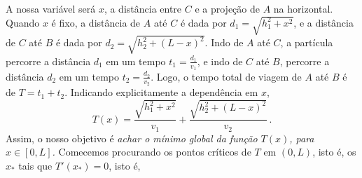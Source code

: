 \begin{center}
\begin{bmlimage}\end{bmlimage}
\end{center}
A nossa variável será $x$, a distância entre $C$ e a projeção de $A$ na
horizontal.
Quando $x$ é fixo, a distância de $A$ até $C$ é dada por
$d_1=\sqrt{h_1^2+x^2}$, e a distância de $C$ até $B$ é dada por
$d_2=\sqrt{h_2^2+(L-x)^2}$.
Indo de $A$ até $C$, a partícula percorre a distância $d_1$ em um
tempo $t_1=\frac{d_1}{v_1}$, e indo de $C$ até $B$, percorre a distância $d_2$
em um
tempo $t_2=\frac{d_2}{v_2}$. Logo, o tempo total de viagem de $A$ até $B$ é
de $T=t_1+t_2$. Indicando explicitamente a dependência em $x$, 
$$
T(x)=\frac{\sqrt{h_1^2+x^2}}{v_1}+\frac{\sqrt{h_2^2+(L-x)^2}}{v_2}\,.
$$
Assim, o nosso objetivo é \emph{achar o mínimo global da função $T(x)$,
para $x\in [0,L]$.} Comecemos procurando os pontos críticos de $T$ em
$(0,L)$, isto é, os $x_*$ tais que $T'(x_*)=0$, isto é,

